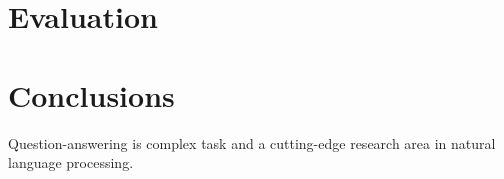 \documentclass{acm_proc_article-sp}
\begin{document}

\section{Evaluation}



\section{Conclusions}

Question-answering is complex task and a cutting-edge research area
in natural language processing. 



%

 

%
\end{document}
